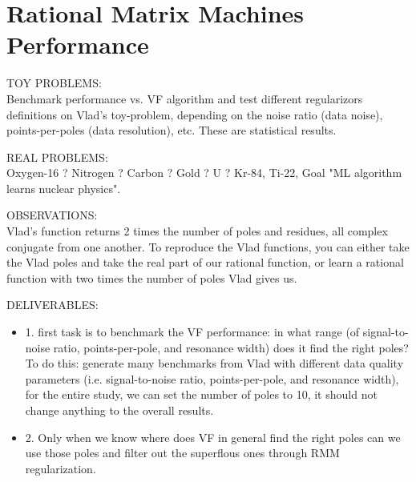 \documentclass{article}
\begin{document}
\section{\label{sec: Rational Matrix Machines Performance}Rational Matrix Machines Performance}

TOY PROBLEMS:\\
Benchmark performance vs. VF algorithm and test different regularizors definitions on Vlad's toy-problem, depending on the noise ratio (data noise), points-per-poles (data resolution), etc.
These are statistical results. 

REAL PROBLEMS:\\
Oxygen-16 ? Nitrogen ? Carbon ? Gold ? U ? Kr-84, Ti-22, 
Goal "ML algorithm learns nuclear physics". 



OBSERVATIONS:\\
Vlad's function returns 2 times the number of poles and residues, all complex conjugate from one another. 
To reproduce the Vlad functions, you can either take the Vlad poles and take the real part of our rational function, or learn a rational function with two times the number of poles Vlad gives us. 

DELIVERABLES:\\
\begin{itemize}
    \item 1. first task is to benchmark the VF performance: in what range (of signal-to-noise ratio, points-per-pole, and resonance width) does it find the right poles?\\
    To do this: generate many benchmarks from Vlad with different data quality parameters (i.e. signal-to-noise ratio, points-per-pole, and resonance width), for the entire study, we can set the number of poles to 10, it should not change anything to the overall results. 
    \item 2. Only when we know where does VF in general find the right poles can we use those poles and filter out the superflous ones through RMM regularization. 
\end{itemize}
\end{document}
